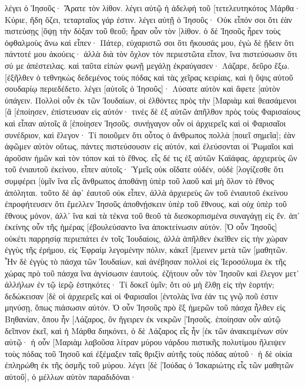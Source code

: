 λέγει ὁ Ἰησοῦς· Ἄρατε τὸν λίθον. λέγει αὐτῷ ἡ ἀδελφὴ τοῦ [τετελευτηκότος Μάρθα· Κύριε, ἤδη ὄζει, τεταρταῖος γάρ ἐστιν. 
λέγει αὐτῇ ὁ Ἰησοῦς· Οὐκ εἶπόν σοι ὅτι ἐὰν πιστεύσῃς [ὄψῃ τὴν δόξαν τοῦ θεοῦ; 
ἦραν οὖν τὸν [λίθον. ὁ δὲ Ἰησοῦς ἦρεν τοὺς ὀφθαλμοὺς ἄνω καὶ εἶπεν· Πάτερ, εὐχαριστῶ σοι ὅτι ἤκουσάς μου, 
ἐγὼ δὲ ᾔδειν ὅτι πάντοτέ μου ἀκούεις· ἀλλὰ διὰ τὸν ὄχλον τὸν περιεστῶτα εἶπον, ἵνα πιστεύσωσιν ὅτι σύ με ἀπέστειλας. 
καὶ ταῦτα εἰπὼν φωνῇ μεγάλῃ ἐκραύγασεν· Λάζαρε, δεῦρο ἔξω. 
[ἐξῆλθεν ὁ τεθνηκὼς δεδεμένος τοὺς πόδας καὶ τὰς χεῖρας κειρίαις, καὶ ἡ ὄψις αὐτοῦ σουδαρίῳ περιεδέδετο. λέγει [αὐτοῖς ὁ Ἰησοῦς]· Λύσατε αὐτὸν καὶ ἄφετε [αὐτὸν ὑπάγειν. 
Πολλοὶ οὖν ἐκ τῶν Ἰουδαίων, οἱ ἐλθόντες πρὸς τὴν [Μαριὰμ καὶ θεασάμενοι [ἃ [ἐποίησεν, ἐπίστευσαν εἰς αὐτόν· 
τινὲς δὲ ἐξ αὐτῶν ἀπῆλθον πρὸς τοὺς Φαρισαίους καὶ εἶπαν αὐτοῖς ἃ [ἐποίησεν Ἰησοῦς. 
συνήγαγον οὖν οἱ ἀρχιερεῖς καὶ οἱ Φαρισαῖοι συνέδριον, καὶ ἔλεγον· Τί ποιοῦμεν ὅτι οὗτος ὁ ἄνθρωπος πολλὰ [ποιεῖ σημεῖα]; 
ἐὰν ἀφῶμεν αὐτὸν οὕτως, πάντες πιστεύσουσιν εἰς αὐτόν, καὶ ἐλεύσονται οἱ Ῥωμαῖοι καὶ ἀροῦσιν ἡμῶν καὶ τὸν τόπον καὶ τὸ ἔθνος. 
εἷς δέ τις ἐξ αὐτῶν Καϊάφας, ἀρχιερεὺς ὢν τοῦ ἐνιαυτοῦ ἐκείνου, εἶπεν αὐτοῖς· Ὑμεῖς οὐκ οἴδατε οὐδέν, 
οὐδὲ [λογίζεσθε ὅτι συμφέρει [ὑμῖν ἵνα εἷς ἄνθρωπος ἀποθάνῃ ὑπὲρ τοῦ λαοῦ καὶ μὴ ὅλον τὸ ἔθνος ἀπόληται. 
τοῦτο δὲ ἀφ᾽ ἑαυτοῦ οὐκ εἶπεν, ἀλλὰ ἀρχιερεὺς ὢν τοῦ ἐνιαυτοῦ ἐκείνου ἐπροφήτευσεν ὅτι ἔμελλεν Ἰησοῦς ἀποθνῄσκειν ὑπὲρ τοῦ ἔθνους, 
καὶ οὐχ ὑπὲρ τοῦ ἔθνους μόνον, ἀλλ᾽ ἵνα καὶ τὰ τέκνα τοῦ θεοῦ τὰ διεσκορπισμένα συναγάγῃ εἰς ἕν. 
ἀπ᾽ ἐκείνης οὖν τῆς ἡμέρας [ἐβουλεύσαντο ἵνα ἀποκτείνωσιν αὐτόν. 
[Ὁ οὖν Ἰησοῦς] οὐκέτι παρρησίᾳ περιεπάτει ἐν τοῖς Ἰουδαίοις, ἀλλὰ ἀπῆλθεν ἐκεῖθεν εἰς τὴν χώραν ἐγγὺς τῆς ἐρήμου, εἰς Ἐφραὶμ λεγομένην πόλιν, κἀκεῖ [ἔμεινεν μετὰ τῶν [μαθητῶν. 
Ἦν δὲ ἐγγὺς τὸ πάσχα τῶν Ἰουδαίων, καὶ ἀνέβησαν πολλοὶ εἰς Ἱεροσόλυμα ἐκ τῆς χώρας πρὸ τοῦ πάσχα ἵνα ἁγνίσωσιν ἑαυτούς. 
ἐζήτουν οὖν τὸν Ἰησοῦν καὶ ἔλεγον μετ᾽ ἀλλήλων ἐν τῷ ἱερῷ ἑστηκότες· Τί δοκεῖ ὑμῖν; ὅτι οὐ μὴ ἔλθῃ εἰς τὴν ἑορτήν; 
δεδώκεισαν [δὲ οἱ ἀρχιερεῖς καὶ οἱ Φαρισαῖοι [ἐντολὰς ἵνα ἐάν τις γνῷ ποῦ ἐστιν μηνύσῃ, ὅπως πιάσωσιν αὐτόν. 
Ὁ οὖν Ἰησοῦς πρὸ ἓξ ἡμερῶν τοῦ πάσχα ἦλθεν εἰς Βηθανίαν, ὅπου ἦν [Λάζαρος, ὃν ἤγειρεν ἐκ νεκρῶν [Ἰησοῦς. 
ἐποίησαν οὖν αὐτῷ δεῖπνον ἐκεῖ, καὶ ἡ Μάρθα διηκόνει, ὁ δὲ Λάζαρος εἷς ἦν [ἐκ τῶν ἀνακειμένων σὺν αὐτῷ· 
ἡ οὖν [Μαριὰμ λαβοῦσα λίτραν μύρου νάρδου πιστικῆς πολυτίμου ἤλειψεν τοὺς πόδας τοῦ Ἰησοῦ καὶ ἐξέμαξεν ταῖς θριξὶν αὐτῆς τοὺς πόδας αὐτοῦ· ἡ δὲ οἰκία ἐπληρώθη ἐκ τῆς ὀσμῆς τοῦ μύρου. 
λέγει [δὲ [Ἰούδας ὁ Ἰσκαριώτης εἷς τῶν μαθητῶν αὐτοῦ], ὁ μέλλων αὐτὸν παραδιδόναι· 
